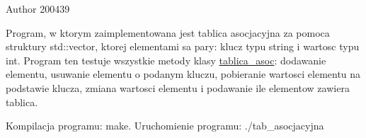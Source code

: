 \begin{DoxyAuthor}{\-Author}
200439
\end{DoxyAuthor}
\-Program, w ktorym zaimplementowana jest tablica asocjacyjna za pomoca struktury std\-::vector, ktorej elementami sa pary\-: klucz typu string i wartosc typu int. \-Program ten testuje wszystkie metody klasy \hyperlink{classtablica__asoc}{tablica\-\_\-asoc}\-: dodawanie elementu, usuwanie elementu o podanym kluczu, pobieranie wartosci elementu na podstawie klucza, zmiana wartosci elementu i podawanie ile elementow zawiera tablica.

\-Kompilacja programu\-: make. \-Uruchomienie programu\-: ./tab\-\_\-asocjacyjna 